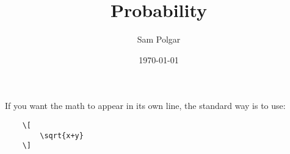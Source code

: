 \documentclass[10pt]{article}
\begin{document}
\title{Probability}

\author{%
   Sam Polgar%
}

\date{\today}

\maketitle





% 

% 








If you want the math to appear in its own line, the standard way is to use:

\begin{verbatim}
    \[
        \sqrt{x+y}
    \]
\end{verbatim}




%    
%    
\end{document}

